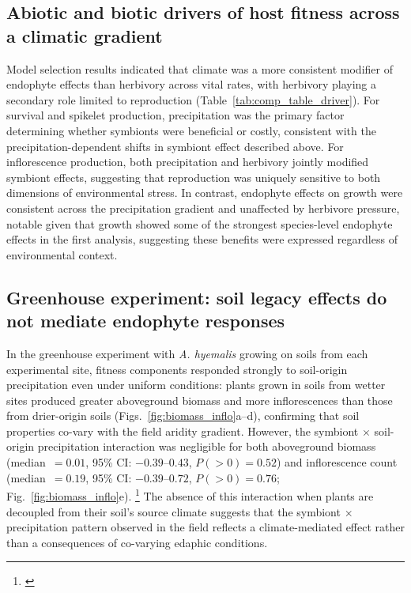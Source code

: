 \documentclass[12pt]{article}\usepackage[]{graphicx}\usepackage[dvipsnames]{xcolor}
\newcommand{\tom}[2]{{\color{red}{#1}}\footnote{\textit{\color{red}{#2}}}}
\begin{document}
\subsection*{Abiotic and biotic drivers of host fitness across a climatic gradient}
Model selection results indicated that climate was a more consistent modifier of endophyte effects than herbivory across vital rates, with herbivory playing a secondary role limited to reproduction (Table~\ref{tab:comp_table_driver}). 
For survival and spikelet production, precipitation was the primary factor determining whether symbionts were beneficial or costly, consistent with the precipitation-dependent shifts in symbiont effect described above. 
For inflorescence production, both precipitation and herbivory jointly modified symbiont effects, suggesting that reproduction was uniquely sensitive to both dimensions of environmental stress.
In contrast, endophyte effects on growth were consistent across the precipitation gradient and unaffected by herbivore pressure, notable given that growth showed some of the strongest species-level endophyte effects in the first analysis, suggesting these benefits were expressed regardless of environmental context. 
 
 \subsection*{Greenhouse experiment: soil legacy effects do not mediate endophyte responses}
In the greenhouse experiment with \textit{A. hyemalis} growing on soils from each experimental site, fitness components responded strongly to soil-origin precipitation even under uniform conditions: plants grown in soils from wetter sites produced greater aboveground biomass and more inflorescences than those from drier-origin soils (Figs.~\ref{fig:biomass_inflo}a--d), confirming that soil properties co-vary with the field aridity gradient. 
However, the symbiont $\times$ soil-origin precipitation interaction was negligible for both aboveground biomass (median~$= 0.01$, 95\% CI: $-0.39$--$0.43$, $P(>0) = 0.52$) and inflorescence count (median~$= 0.19$, 95\% CI: $-0.39$--$0.72$, $P(>0) = 0.76$; Fig.~\ref{fig:biomass_inflo}e). 
\tom{Total spikelet production mirrored this trend (Fig.~\ref{sup:spikelet_soil}).}{We do not have AGHY spiklet data from the field experiment to compare this against. So I think it is possible to drop this piece of the greenhouse data, though there is probably no harm in keeping it.}
The absence of this interaction when plants are decoupled from their soil's source climate suggests that the symbiont $\times$ precipitation pattern observed in the field reflects a climate-mediated effect rather than a consequences of co-varying edaphic conditions.
\end{document}

